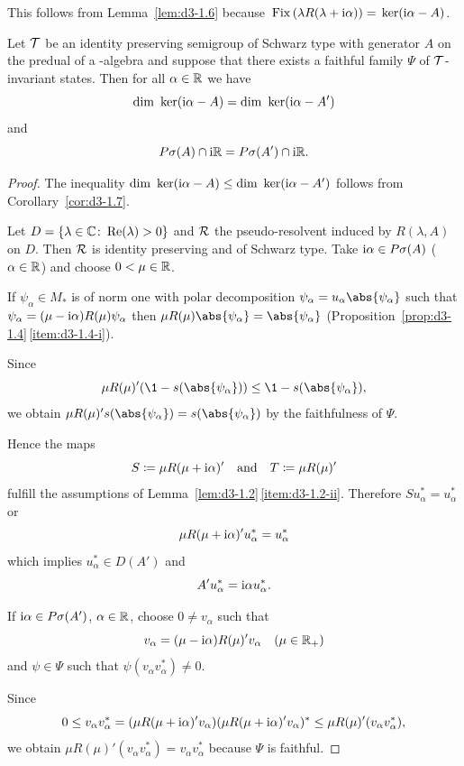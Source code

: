 This follows from Lemma~\ref{lem:d3-1.6} because $\mathop{}\mathrm{Fix}\left(\lambda R(\lambda+\mathrm{i}\alpha)\right) = \mathop{}\mathrm{ker}(\mathrm{i}\alpha-A)$.
\begin{proposition}\label{prop:d3-1.8}
Let $\mathcal{T}$ be an identity preserving semigroup of Schwarz type with generator $A$ on the predual of a \WA-algebra and suppose that there exists a faithful family $\Psi$ of\/ $\mathcal{T}$-invariant states.
Then for all $\alpha \in \mathbb{R}$ we have
\[
\mathop{}\!\mathrm{dim}\, \mathop{}\mathrm{ker}(\mathrm{i}\alpha - A) = \mathop{}\!\mathrm{dim}\, \mathop{}\mathrm{ker}(\mathrm{i}\alpha - A')
\]
and
\[
P\sigma(A) \cap \mathrm{i}\mathbb{R} = P{\sigma}(A') \cap \mathrm{i}\mathbb{R} .
\]
\end{proposition}
\begin{proof}
The inequality $\dim \Kern{\im\alpha - A} \leq \dim \Kern{\im\alpha - A'}$ follows from Corollary~\ref{cor:d3-1.7}.

Let $D = \{\lambda \in \mathbb{C} \colon \mathop{}\!\mathrm{Re}(\lambda) > 0\}$ and $\mathcal{R}$ the pseudo-resolvent induced by $R(\lambda,A)$ on $D$.
Then $\mathcal{R}$ is identity preserving and of Schwarz type.
Take $\mathrm{i}\alpha \in P\sigma(A)$ ($\alpha \in \mathbb{R}$) and choose $0 < \mu \in \mathbb{R}$.

If\/ $\psi_{\alpha} \in M_{*}$ is of norm one with polar decomposition $\psi_{\alpha} = u_{\alpha}\abs{\psi_{\alpha}}$ such that $\psi_{\alpha} = (\mu - \mathrm{i}\alpha)R(\mu)\psi_{\alpha}$ then $\mu R(\mu)\abs{\psi_{\alpha}} = \abs{\psi_{\alpha}}$ (Proposition~\ref{prop:d3-1.4}\,\ref{item:d3-1.4-i}).

Since
\[
\mu R(\mu)'(\1 - s(\abs{\psi_{\alpha}})) 
    \leq \1 - s(\abs{\psi_{\alpha}}) ,
\]
we obtain $\mu R(\mu)'s(\abs{\psi_{\alpha}}) = s(\abs{\psi_{\alpha}})$ by the faithfulness of\/ $\Psi$.

Hence the maps 
\[
S \coloneq \mu R(\mu + \mathrm{i}\alpha)'  
\quad \text{and} \quad 
T \coloneq \mu R(\mu)'
\]
fulfill the assumptions of Lemma~\ref{lem:d3-1.2}\,\ref{item:d3-1.2-ii}.
Therefore $Su_{\alpha}^{*} = u_{\alpha}^{*}$ or 
\[
\mu R(\mu+\mathrm{i}\alpha)'u_{\alpha}^{*} = u_{\alpha}^{*}
\]
which implies $u_{\alpha}^{*} \in D(A')$ and 
\[
A'u_{\alpha}^{*} = \mathrm{i}\alpha u_{\alpha}^{*}.
\]

If\/ $\mathrm{i}\alpha \in P{\sigma}(A')$, $\alpha \in \mathbb{R}$, choose $0 \neq v_{\alpha}$ such that
\[
v_{\alpha} = (\mu - \mathrm{i}\alpha)R(\mu)'v_{\alpha} \quad (\mu \in \mathbb{R}_{+})
\]
and $\psi \in \Psi$ such that $\psi(v_{\alpha}v_{\alpha}^{*}) \neq 0$.

Since
\[
0 \leq v_{\alpha}v_{\alpha}^{*} = (\mu R(\mu + \im\alpha)'v_{\alpha})(\mu R(\mu + \im\alpha)'v_{\alpha})^{*} \leq \mu R(\mu)'(v_{\alpha}v_{\alpha}^{*}) ,
\]
we obtain $\mu R(\mu)'(v_{\alpha}v_{\alpha}^{*}) = v_{\alpha}v_{\alpha}^{*}$ because $\Psi$ is faithful.


\end{proof}
